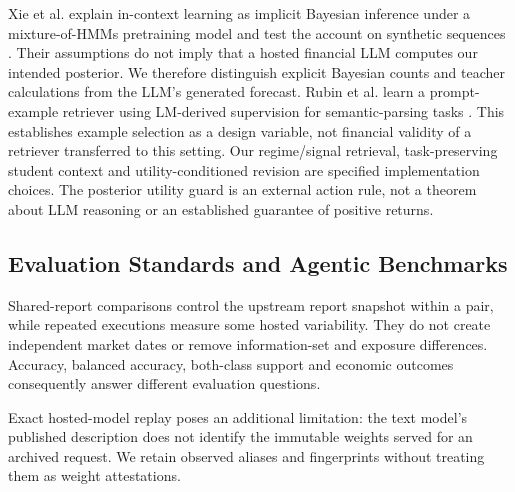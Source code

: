 Xie et al. explain in-context learning as implicit Bayesian inference under a mixture-of-HMMs pretraining model and test the account on synthetic sequences \cite{xie2022implicitbayes}. Their assumptions do not imply that a hosted financial LLM computes our intended posterior. We therefore distinguish explicit Bayesian counts and teacher calculations from the LLM's generated forecast. Rubin et al. learn a prompt-example retriever using LM-derived supervision for semantic-parsing tasks \cite{rubin2022retrieve}. This establishes example selection as a design variable, not financial validity of a retriever transferred to this setting. Our regime/signal retrieval, task-preserving student context and utility-conditioned revision are specified implementation choices. The posterior utility guard is an external action rule, not a theorem about LLM reasoning or an established guarantee of positive returns.

\subsection{Evaluation Standards and Agentic Benchmarks}
Shared-report comparisons control the upstream report snapshot within a pair, while repeated executions measure some hosted variability. They do not create independent market dates or remove information-set and exposure differences. Accuracy, balanced accuracy, both-class support and economic outcomes consequently answer different evaluation questions.

Exact hosted-model replay poses an additional limitation: the text model's published description \cite{openai2025gptoss} does not identify the immutable weights served for an archived request. We retain observed aliases and fingerprints without treating them as weight attestations.
